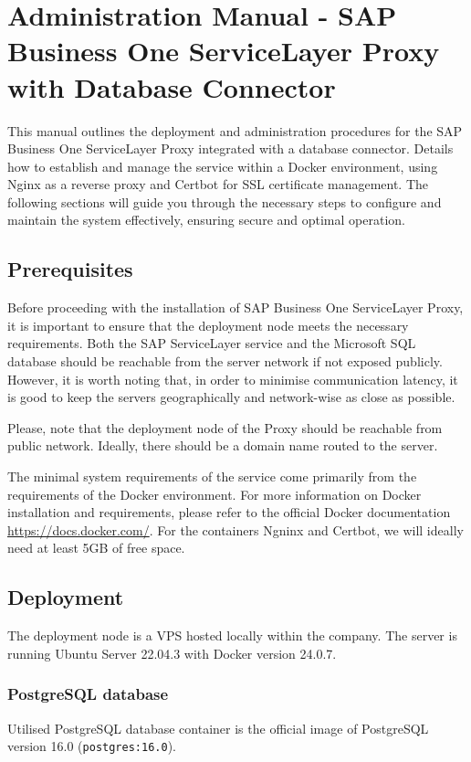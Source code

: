 \chapter{Administration Manual - SAP Business One ServiceLayer Proxy with Database Connector}
\label{attachments:admin-manual-sap}
This manual outlines the deployment and administration procedures for the SAP Business One ServiceLayer Proxy integrated with a database connector. 
Details how to establish and manage the service within a Docker environment, using Nginx as a reverse proxy and Certbot for SSL certificate management. 
The following sections will guide you through the necessary steps to configure and maintain the system effectively, ensuring secure and optimal operation.

\section{Prerequisites}
Before proceeding with the installation of SAP Business One ServiceLayer Proxy, it is important to ensure that the deployment node meets the necessary requirements.
Both the SAP ServiceLayer service and the Microsoft SQL database should be reachable from the server network if not exposed publicly.
However, it is worth noting that, in order to minimise communication latency, it is good to keep the servers geographically and network-wise as close as possible. 

Please, note that the deployment node of the Proxy should be reachable from public network.
Ideally, there should be a domain name routed to the server.

The minimal system requirements of the service come primarily from the requirements of the Docker environment.
For more information on Docker installation and requirements, please refer to the official Docker documentation \url{https://docs.docker.com/}.
For the containers Ngninx and Certbot, we will ideally need at least 5GB of free space.

\section{Deployment}
\label{sec:admin-manual-sap.deployment}
The deployment node is a \ac{VPS} hosted locally within the company.
The server is running Ubuntu Server 22.04.3 with Docker version 24.0.7.

\subsection{PostgreSQL database}
Utilised PostgreSQL database container is the official image of PostgreSQL version 16.0 (\texttt{postgres:16.0}).

